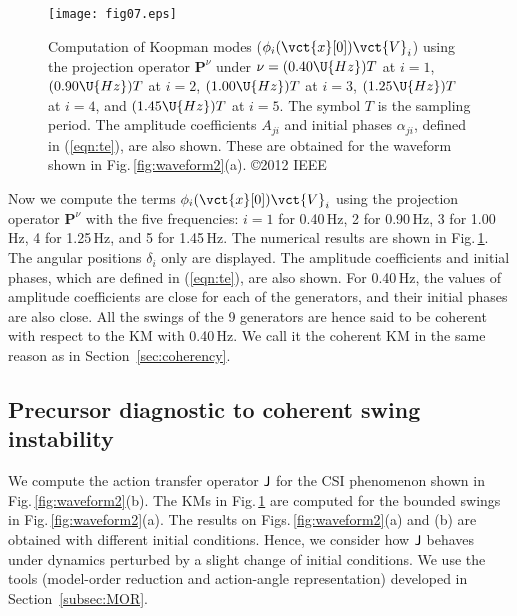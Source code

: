\documentclass[a4paper,10pt]{article}
\def\bP{{\mathbf{P}}}
\begin{document}
% 
\begin{figure}[t] %
\begin{center}
\texttt{[image: fig07.eps]}
\caption{%
Computation of Koopman modes ($\phi_i(\vct{x}[0])\vct{V}_i$) using the projection operator $\bP^\nu$ under $\nu=(0.40\U{Hz})T$ at $i=1$, $(0.90\U{Hz})T$ at $i=2$, $(1.00\U{Hz})T$ at $i=3$, $(1.25\U{Hz})T$ at $i=4$, and $(1.45\U{Hz})T$ at $i=5$.  
The symbol $T$ is the sampling period.  
The amplitude coefficients $A_{ji}$ and initial phases $\alpha_{ji}$, defined in (\ref{eqn:te}), are also shown.  
These are obtained for the waveform shown in Fig.\,\ref{fig:waveform2}(a).
\copyright 2012 IEEE
}%
\label{fig:KM2}
\end{center}
\end{figure}

%
Now we compute the terms $\phi_i(\vct{x}[0])\vct{V}_i$ using the projection operator $\bP^\nu$ with the five frequencies: $i=1$ for 0.40\,Hz, 2 for 0.90\,Hz, 3 for 1.00\,Hz, 4 for 1.25\,Hz, and 5 for 1.45\,Hz.  
The numerical results are shown in Fig.\,\ref{fig:KM2}.  
The angular positions $\delta_i$ only are displayed.  
The amplitude coefficients and initial phases, which are defined in (\ref{eqn:te}), are also shown.  
For 0.40\,Hz, the values of amplitude coefficients are close for each of the generators, and their initial phases are also close.  
All the swings of the 9 generators are hence said to be coherent with respect to the KM with 0.40\,Hz.  
We call it the coherent KM in the same reason as in Section~\ref{sec:coherency}.  


\subsection{Precursor diagnostic to coherent swing instability}
\label{subsec:precursor-diagnostic}
%
We compute the action transfer operator ${\sf J}$ for the CSI phenomenon shown in Fig.\,\ref{fig:waveform2}(b).  
The KMs in Fig.\,\ref{fig:KM2} are computed for the bounded swings in Fig.\,\ref{fig:waveform2}(a).  
The results on Figs.\,\ref{fig:waveform2}(a) and (b) are obtained with different initial conditions.  
Hence, we consider how ${\sf J}$ behaves under dynamics perturbed by a slight change of initial conditions.  
We use the tools (model-order reduction and action-angle representation) developed in Section~\ref{subsec:MOR}.  
\end{document}
